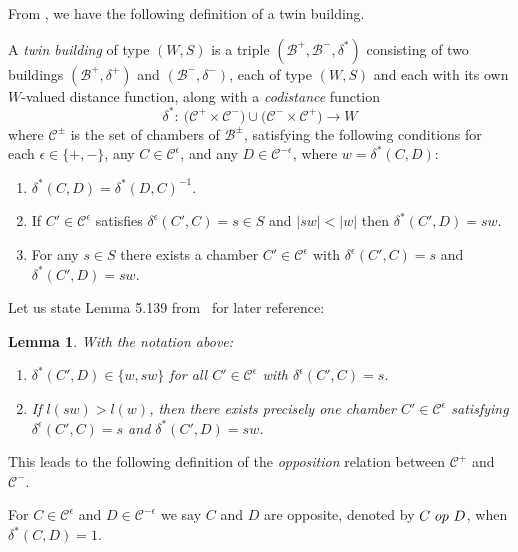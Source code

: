 \documentclass[11pt]{article}
\numberwithin{equation}{section}
\numberwithin{equation}{section}
\newtheorem{Lemma}[Theorem]{Lemma}
\def\eps{\epsilon}
\def\cB{\mathcal B}
\def\cC{\mathcal C}
\begin{document}
From \cite[Definition 5.133]{AbramenkoBrown08}, we have the following definition of a twin building.
\begin{Definition}\label{definition:Twin_Building}
A {\em twin building} of type $(W,S)$ is a triple $(\cB^+, \cB^-, \delta^*)$ consisting of two buildings $(\cB^+, \delta^+)$ and $(\cB^-, \delta^-)$, each of type $(W,S)$ and each with its own $W$-valued distance function, along with a {\it codistance} function
\[\delta^* \colon \ \big(\cC^+ \times\cC^-\big) \cup \big(\cC^- \times\cC^+\big) \to W\]
where $\cC^\pm$ is the set of chambers of $\cB^\pm$, satisfying the following conditions for each $\eps\in\{+,-\}$, any $C\in\cC^\eps$,
and any $D\in\cC^{-\eps}$, where $w = \delta^*(C,D)$:
\begin{enumerate}\itemsep=0pt
 \item[(Tw1)] $\delta^*(C,D) = \delta^*(D,C)^{-1}$.
 \item[(Tw2)] If $C'\in\cC^\eps$ satisfies $\delta^\eps(C',C) = s\in S$ and $|sw| < |w|$ then $\delta^*(C',D) = sw$.
 \item[(Tw3)] For any $s\in S$ there exists a chamber $C'\in\cC^\eps$ with $\delta^\eps(C',C) = s$ and $\delta^*(C',D) = sw$.
\end{enumerate}
\end{Definition}

Let us state Lemma 5.139 from~\cite{AbramenkoBrown08} for later reference:

\begin{Lemma}\label{lemma:longer_element_chamber_unique}
With the notation above:
\begin{enumerate}\itemsep=0pt
\item[$1.$] $\delta^*(C',D) \in \{w, sw\}$ for all $C'\in\cC^\eps$ with $\delta^\eps(C',C) = s$.
\item[$2.$] If $l(sw) > l(w)$, then there exists precisely one chamber $C'\in\cC^\eps$ satisfying $\delta^\eps(C',C) = s$ and $\delta^*(C',D) = sw$.
\end{enumerate}
\end{Lemma}

This leads to the following definition of the {\it opposition} relation between $\cC^+$ and $\cC^-$.
\begin{Definition}\label{definition:Opposition_Relation}
For $C\in\cC^\eps$ and $D\in\cC^{-\eps}$ we say $C$ and $D$ are opposite, denoted by $C\ {\rm op}\ D$, when $\delta^*(C,D) = 1$.
\end{Definition}
\end{document}
